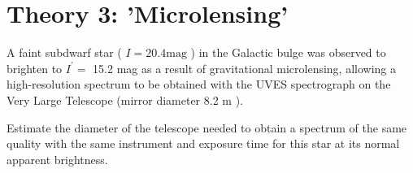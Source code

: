 \documentclass[10pt]{article}
\begin{document}
\section*{Theory 3: 'Microlensing'}
A faint subdwarf star ( $I=20.4 \mathrm{mag}$ ) in the Galactic bulge was observed to brighten to $I^{\prime}=$ 15.2 mag as a result of gravitational microlensing, allowing a high-resolution spectrum to be obtained with the UVES spectrograph on the Very Large Telescope (mirror diameter 8.2 m ).

Estimate the diameter of the telescope needed to obtain a spectrum of the same quality with the same instrument and exposure time for this star at its normal apparent brightness.\\
\end{document}
